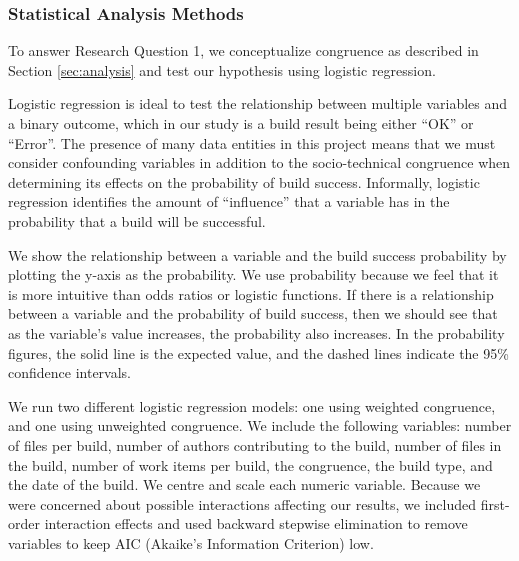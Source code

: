 \subsubsection{Statistical Analysis Methods}


To answer Research Question 1, we conceptualize congruence as described in Section \ref{sec:analysis} and test our hypothesis using logistic regression.

Logistic regression is ideal to test the relationship between multiple variables and a binary outcome, which in our study is a build result being either ``OK'' or ``Error''. The presence of many data entities in this project means that we must consider confounding variables in addition to the socio-technical congruence when determining its effects on the probability of build success. Informally, logistic regression identifies the amount of ``influence'' that a variable has in the probability that a build will be successful.

We show the relationship between a variable and the build success probability by plotting the y-axis as the probability. We use probability because we feel that it is more intuitive than odds ratios or logistic functions. If there is a relationship between a variable and the probability of build success, then we should see that as the variable's value increases, the probability also increases. In the probability figures, the solid line is the expected value, and the dashed lines indicate the 95\% confidence intervals.

We run two different logistic regression models: one using weighted congruence, and one using unweighted congruence. We include the following variables: number of files per build, number of authors contributing to the build, number of files in the build, number of work items per build, the congruence, the build type, and the date of the build. We centre and scale each numeric variable.
Because we were concerned about possible interactions affecting our results, we included first-order interaction effects and used backward stepwise elimination to remove variables to keep AIC (Akaike's Information Criterion) low.


